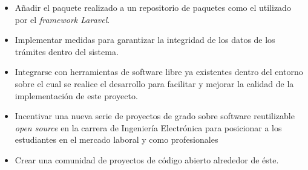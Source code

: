 \begin{itemize}
    \item Añadir el paquete realizado a un repositorio de paquetes como el
          utilizado por el \textit{framework Laravel}.

    \item Implementar medidas para garantizar la integridad de los datos de los
          trámites dentro del sistema.

    \item Integrarse con herramientas de software libre ya existentes dentro del
          entorno sobre el cual se realice el desarrollo para facilitar y mejorar
          la calidad de la implementación de este proyecto.

    \item Incentivar una nueva serie de proyectos de grado sobre software
          reutilizable \textit{open source} en la carrera de Ingeniería Electrónica para
          posicionar a los estudiantes en el mercado laboral y como profesionales

    \item Crear una comunidad de proyectos de código abierto alrededor de éste.
\end{itemize}